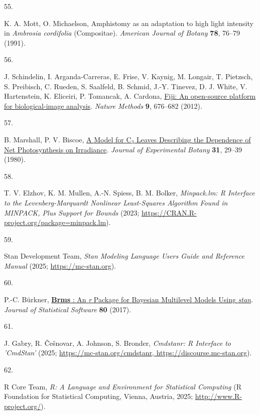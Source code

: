 \documentclass[
  letterpaper,
  DIV=11,
  numbers=noendperiod]{scrartcl}
\newlength{\cslhangindent}
\newlength{\csllabelwidth}
\newenvironment{CSLReferences}[2] %
 {\begin{list}{}{%
  \setlength{\itemindent}{0pt}
  \setlength{\leftmargin}{0pt}
  \setlength{\parsep}{0pt}
  \ifodd #1
   \setlength{\leftmargin}{\cslhangindent}
   \setlength{\itemindent}{-1\cslhangindent}
  \fi
  \setlength{\itemsep}{#2\baselineskip}}}
 {\end{list}}
\newcommand{\CSLLeftMargin}[1]{\parbox[t]{\csllabelwidth}{\strut#1\strut}}
\newcommand{\CSLRightInline}[1]{\parbox[t]{\linewidth - \csllabelwidth}{\strut#1\strut}}
\begin{document}
\begin{CSLReferences}{0}{1}
\CSLLeftMargin{55. }%
\CSLRightInline{K. A. Mott, O. Michaelson, Amphistomy as an adaptation
to high light intensity in \emph{{Ambrosia} cordifolia} ({Compositae}).
\emph{American Journal of Botany} \textbf{78}, 76--79 (1991).}

\CSLLeftMargin{56. }%
\CSLRightInline{J. Schindelin, I. Arganda-Carreras, E. Frise, V. Kaynig,
M. Longair, T. Pietzsch, S. Preibisch, C. Rueden, S. Saalfeld, B.
Schmid, J.-Y. Tinevez, D. J. White, V. Hartenstein, K. Eliceiri, P.
Tomancak, A. Cardona, \href{https://doi.org/10.1038/nmeth.2019}{Fiji: An
open-source platform for biological-image analysis}. \emph{Nature
Methods} \textbf{9}, 676--682 (2012).}

\CSLLeftMargin{57. }%
\CSLRightInline{B. Marshall, P. V. Biscoe,
\href{https://doi.org/10.1093/jxb/31.1.29}{A {Model} for
{C}\(_{\textrm{3}}\) {Leaves} {Describing} the {Dependence} of {Net}
{Photosynthesis} on {Irradiance}}. \emph{Journal of Experimental Botany}
\textbf{31}, 29--39 (1980).}

\CSLLeftMargin{58. }%
\CSLRightInline{T. V. Elzhov, K. M. Mullen, A.-N. Spiess, B. M. Bolker,
\emph{Minpack.lm: {R} {Interface} to the {Levenberg}-{Marquardt}
{Nonlinear} {Least}-{Squares} {Algorithm} {Found} in {MINPACK}, {Plus}
{Support} for {Bounds}} (2023;
\url{https://CRAN.R-project.org/package=minpack.lm}).}

\CSLLeftMargin{59. }%
\CSLRightInline{Stan Development Team, \emph{Stan {Modeling} {Language}
{Users} {Guide} and {Reference} {Manual}} (2025;
\url{https://mc-stan.org}).}

\CSLLeftMargin{60. }%
\CSLRightInline{P.-C. Bürkner,
\href{https://doi.org/10.18637/jss.v080.i01}{\textbf{Brms} : {An}
\emph{r} {Package} for {Bayesian} {Multilevel} {Models} {Using}
\emph{stan}}. \emph{Journal of Statistical Software} \textbf{80}
(2017).}

\CSLLeftMargin{61. }%
\CSLRightInline{J. Gabry, R. Češnovar, A. Johnson, S. Bronder,
\emph{Cmdstanr: {R} {Interface} to '{CmdStan}'} (2025;
\href{https://mc-stan.org/cmdstanr,\%20https://discourse.mc-stan.org}{https://mc-stan.org/cmdstanr,
https://discourse.mc-stan.org}).}

\CSLLeftMargin{62. }%
\CSLRightInline{R Core Team, \emph{R: {A} {Language} and {Environment}
for {Statistical} {Computing}} (R Foundation for Statistical Computing,
Vienna, Austria, 2025; \url{http://www.R-project.org/}).}


\end{CSLReferences}
\end{document}
